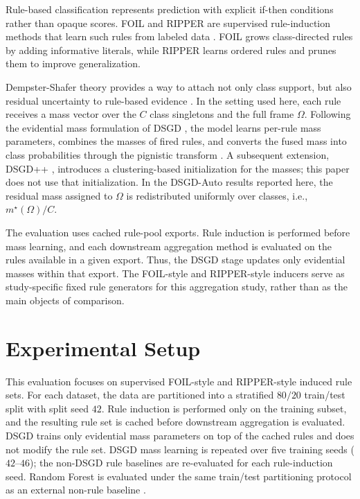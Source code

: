 \documentclass[conference]{IEEEtran}
\begin{document}
Rule-based classification represents prediction with explicit if-then conditions rather than opaque scores. FOIL and RIPPER are supervised rule-induction methods that learn such rules from labeled data \cite{quinlan1990,cohen1995}. FOIL grows class-directed rules by adding informative literals, while RIPPER learns ordered rules and prunes them to improve generalization.

Dempster-Shafer theory provides a way to attach not only class support, but also residual uncertainty to rule-based evidence \cite{dempster1968,shafer1976}. In the setting used here, each rule receives a mass vector over the $C$ class singletons and the full frame $\Omega$. Following the evidential mass formulation of DSGD \cite{penafiel2020}, the model learns per-rule mass parameters, combines the masses of fired rules, and converts the fused mass into class probabilities through the pignistic transform \cite{smets1994}. A subsequent extension, DSGD++ \cite{tarkhanyan2025}, introduces a clustering-based initialization for the masses; this paper does not use that initialization. In the DSGD-Auto results reported here, the residual mass assigned to $\Omega$ is redistributed uniformly over classes, i.e., $m^\star(\Omega)/C$.

The evaluation uses cached rule-pool exports. Rule induction is performed before mass learning, and each downstream aggregation method is evaluated on the rules available in a given export. Thus, the DSGD stage updates only evidential masses within that export. The FOIL-style and RIPPER-style inducers serve as study-specific fixed rule generators for this aggregation study, rather than as the main objects of comparison.

\section{Experimental Setup}

This evaluation focuses on supervised FOIL-style and RIPPER-style induced rule sets. For each dataset, the data are partitioned into a stratified $80/20$ train/test split with split seed $42$. Rule induction is performed only on the training subset, and the resulting rule set is cached before downstream aggregation is evaluated. DSGD trains only evidential mass parameters on top of the cached rules and does not modify the rule set. DSGD mass learning is repeated over five training seeds ($42$--$46$); the non-DSGD rule baselines are re-evaluated for each rule-induction seed. Random Forest is evaluated under the same train/test partitioning protocol as an external non-rule baseline \cite{breiman2001}.
\end{document}
